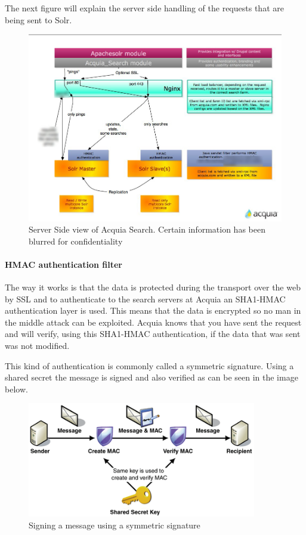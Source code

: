 The next figure will explain the server side handling of the requests that are being sent to Solr.
\begin{figure}[H]
     \includegraphics[width=\textwidth]{images/acquia_architecture.jpg}
     \caption{Server Side view of Acquia Search. Certain information has been blurred for confidentiality}
\end{figure}

\paragraph{HMAC authentication filter}
The way it works is that the data is protected during the transport over the web by SSL and to authenticate to the search servers at Acquia an SHA1-HMAC authentication layer is used. This means that the data is encrypted so no man in the middle attack can be exploited. Acquia knows that you have sent the request and will verify, using this SHA1-HMAC authentication, if the data that was sent was not modified. 

This kind of authentication is commonly called a symmetric signature. Using a shared secret the message is signed and also verified as can be seen in the image below.

\begin{figure}[H]
     \includegraphics[width=10cm]{images/IC42720.png}
     \caption{Signing a message using a symmetric signature}
\end{figure}


